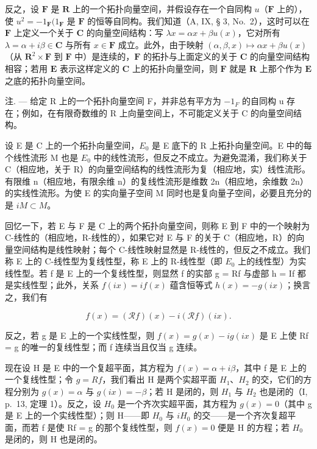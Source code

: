 反之，设 \(\mathbf{F}\) 是 \(\mathbf{R}\) 上的一个拓扑向量空间，并假设存在一个自同构 \(u\)（\(\mathbf{F}\) 上的），使 \(u^2 = -1_{\mathbf{F}}(1_{\mathbf{F}}\) 是 \(\mathbf{F}\) 的恒等自同构。我们知道（A, IX, § 3, No.~2），这时可以在 \(\mathbf{F}\) 上定义一个关于 \(\mathbf{C}\) 的向量空间结构：写 \(\lambda x = \alpha x + \beta u(x)\)，它对所有 \(\lambda = \alpha + i\beta \in \mathbf{C}\) 与所有 \(x \in \mathbf{F}\) 成立。此外，由于映射 \((\alpha, \beta, x) \mapsto \alpha x + \beta u(x)\)（从 \(\mathbf{R}^2 \times \mathbf{F}\) 到 \(\mathbf{F}\) 中）是连续的，\(\mathbf{F}\) 的拓扑与上面定义的关于 \(\mathbf{C}\) 的向量空间结构相容；若用 \(\mathbf{E}\) 表示这样定义的 \(\mathbf{C}\) 上的拓扑向量空间，则 \(\mathbf{F}\) 就是 \(\mathbf{R}\) 上那个作为 \(\mathbf{E}\) 之底的拓扑向量空间。

注. --- 给定 R 上的一个拓扑向量空间 F，并非总有平方为 \(-1_{F}\) 的自同构 u 存在；例如，在有限奇数维的 R 上向量空间上，不可能定义关于 C 的向量空间结构。

设 E 是 C 上的一个拓扑向量空间，\(E_{0}\) 是 E 底下的 R 上拓扑向量空间。E 中的每个线性流形 M 也是 \(E_{0}\) 中的线性流形，但反之不成立。为避免混淆，我们称关于 C（相应地，关于 R）的向量空间结构的线性流形为复（相应地，实）线性流形。有限维 n（相应地，有限余维 n）的复线性流形是维数 2n（相应地，余维数 2n）的实线性流形。为使 E 的实向量子空间 M 同时也是复向量子空间，必要且充分的是 \(iM \subset M\)。

回忆一下，若 E 与 F 是 C 上的两个拓扑向量空间，则称 E 到 F 中的一个映射为 C-线性的（相应地，R-线性的），如果它对 E 与 F 的关于 C（相应地，R）的向量空间结构是线性映射；每个 C-线性映射显然是 R-线性的，但反之不成立。我们称 E 上的 C-线性型为复线性型，称 E 上的 R-线性型（即 \(E_{0}\) 上的线性型）为实线性型。若 f 是 E 上的一个复线性型，则显然 f 的实部 g = Rf 与虚部 h = If 都是实线性型；此外，关系 \(f(ix) = if(x)\) 蕴含恒等式 \(h(x) = -g(ix)\)；换言之，我们有

\[
f (x) = (\mathscr {R} f) (x) - i (\mathscr {R} f) (i x).\tag{1}
\]

反之，若 g 是 E 上的一个实线性型，则 \(f(x) = g(x) - ig(ix)\) 是 E 上使 Rf = g 的唯一的复线性型；而 f 连续当且仅当 g 连续。

现在设 H 是 E 中的一个复超平面，其方程为 \(f(x) = \alpha + i\beta\)，其中 f 是 E 上的一个复线性型；令 \(g = Rf\)，我们看出 H 是两个实超平面 \(H_{1}\)、\(H_{2}\) 的交，它们的方程分别为 \(g(x) = \alpha\) 与 \(g(ix) = -\beta\)；若 H 是闭的，则 \(H_{1}\) 与 \(H_{2}\) 也是闭的（I, p.~13, 定理 1）。反之，设 \(H_{0}\) 是一个齐次实超平面，其方程为 \(g(x) = 0\)（其中 g 是 E 上的一个实线性型）；则 H——即 \(H_{0}\) 与 \(iH_{0}\) 的交——是一个齐次复超平面，而若 f 是使 Rf = g 的那个复线性型，则 \(f(x) = 0\) 便是 H 的方程；若 \(H_{0}\) 是闭的，则 H 也是闭的。

